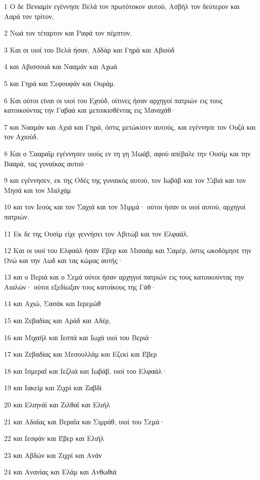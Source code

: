 \par 1 Ο δε Βενιαμίν εγέννησε Βελά τον πρωτότοκον αυτού, Ασβήλ τον δεύτερον και Ααρά τον τρίτον,
\par 2 Νωά τον τέταρτον και Ραφά τον πέμπτον.
\par 3 Και οι υιοί του Βελά ήσαν, Αδδάρ και Γηρά και Αβιούδ
\par 4 και Αβισσουά και Νααμάν και Αχωά
\par 5 και Γηρά και Σεφουφάν και Ουράμ.
\par 6 Και ούτοι είναι οι υιοί του Εχούδ, οίτινες ήσαν αρχηγοί πατριών εις τους κατοικούντας την Γαβαά και μετοικισθέντας εις Μαναχάθ·
\par 7 και Νααμάν και Αχιά και Γηρά, όστις μετώκισεν αυτούς, και εγέννησε τον Ουζά και τον Αχιούδ.
\par 8 Και ο Σααραΐμ εγέννησεν υιούς εν τη γη Μωάβ, αφού απέβαλε την Ουσίμ και την Βααρά, τας γυναίκας αυτού·
\par 9 και εγέννησεν, εκ της Οδές της γυναικός αυτού, τον Ιωβάβ και τον Σιβιά και τον Μησά και τον Μαλχάμ
\par 10 και τον Ιεούς και τον Σαχιά και τον Μιρμά· ούτοι ήσαν οι υιοί αυτού, αρχηγοί πατριών.
\par 11 Εκ δε της Ουσίμ είχε γεννήσει τον Αβιτώβ και τον Ελφαάλ.
\par 12 Και οι υιοί του Ελφαάλ ήσαν Έβερ και Μισαάμ και Σαμέρ, όστις ωκοδόμησε την Ωνώ και την Λωδ και τας κώμας αυτής·
\par 13 και ο Βεριά και ο Σεμά ούτοι ήσαν αρχηγοί πατριών εις τους κατοικούντας την Αιαλών· ούτοι εξεδίωξαν τους κατοίκους της Γάθ·
\par 14 και Αχιώ, Σασάκ και Ιερεμώθ
\par 15 και Ζεβαδίας και Αράδ και Αδέρ,
\par 16 και Μιχαήλ και Ιεσπά και Ιωχά υιοί του Βεριά·
\par 17 και Ζεβαδίας και Μεσουλλάμ και Εζεκί και Έβερ
\par 18 και Ισμεραΐ και Ιεζλιά και Ιωβάβ, υιοί του Ελφαάλ·
\par 19 και Ιακείμ και Ζιχρί και Ζαβδί
\par 20 και Ελιηνάϊ και Ζιλθαΐ και Ελιήλ
\par 21 και Αδαΐας και Βεραΐα και Σιμράθ, υιοί του Σεμά·
\par 22 και Ιεσφάν και Έβερ και Ελιήλ
\par 23 και Αβδών και Ζιχρί και Ανάν
\par 24 και Ανανίας και Ελάμ και Ανθωθιά
